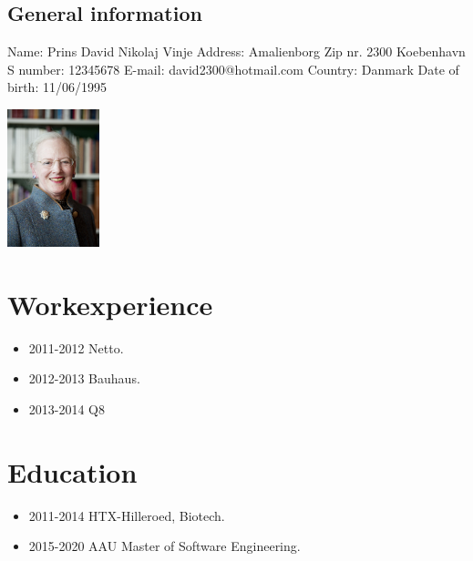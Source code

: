 \begin{center}
 \begin{minipage}[b]{0.45\textwidth} 
\subsection*{General information}
Name: Prins David Nikolaj Vinje 
Address: Amalienborg
Zip nr. 2300 Koebenhavn S
number: 12345678
E-mail: david2300@hotmail.com
Country: Danmark
Date of birth: 11/06/1995
\newline \end{minipage}
 \hfill
\begin{minipage}[b]{3cm}
 \includegraphics[height=4cm]{figures/1200px-Drottning_Margrethe_av_Danmark}
 \end{minipage}
 \end{center}

\section*{Workexperience}
\begin{itemize}
\item 2011-2012 Netto.
\item 2012-2013 Bauhaus.
\item 2013-2014 Q8
\end{itemize}
\section*{Education}
\begin{itemize}
\item 2011-2014 HTX-Hilleroed, Biotech.
\item 2015-2020 AAU Master of Software Engineering.
\end{itemize}

